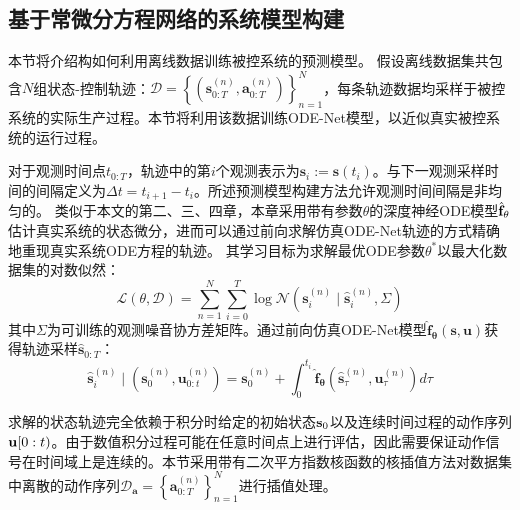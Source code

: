\subsection{基于常微分方程网络的系统模型构建}
\label{sec:ode_system_modeling}
本节将介绍构如何利用离线数据训练被控系统的预测模型。
假设离线数据集共包含$N$组状态-控制轨迹：$\mathcal{D}=\left\{\left(\mathbf{s}_{0: T}^{(n)}, \mathbf{a}_{0: T}^{(n)}\right)\right\}_{n=1}^{N}$，每条轨迹数据均采样于被控系统的实际生产过程。本节将利用该数据训练ODE-Net模型，以近似真实被控系统的运行过程。

对于观测时间点$t_{0: T}$，轨迹中的第$i$个观测表示为$\mathbf{s}_{i}:=\mathbf{s}\left(t_{i}\right)$。与下一观测采样时间的间隔定义为$\Delta t = t_{i+1}-t_i$。所述预测模型构建方法允许观测时间间隔是非均匀的。
类似于本文的第二、三、四章，本章采用带有参数$\theta$的深度神经ODE模型$\hat{\mathbf{f}}_\theta$估计真实系统的状态微分，进而可以通过前向求解仿真ODE-Net轨迹的方式精确地重现真实系统ODE方程的轨迹。
其学习目标为求解最优ODE参数$\theta^*$以最大化数据集的对数似然：
\begin{equation}
\label{equ:likelihood}
    \mathcal{L}(\theta, \mathcal{D})=\sum_{n=1}^{N} \sum_{i=0}^{T} \log \mathcal{N}\left(\mathbf{s}_{i}^{(n)} \mid \hat{\mathbf{s}}_{i}^{(n)}, \Sigma\right)
\end{equation}
其中$\Sigma$为可训练的观测噪音协方差矩阵。通过前向仿真ODE-Net模型$\hat{\mathbf{f}}_{\boldsymbol{\theta}}(\mathbf{s}, \mathbf{u})$获得轨迹采样$\hat{\mathbf{s}}_{0:T}$：
\begin{equation}
\label{equ:state_traj}
\hat{\mathbf{s}}_{i}^{(n)} \mid\left(\mathbf{s}_{0}^{(n)}, \mathbf{u}_{0: t}^{(n)}\right)=\mathbf{s}_{0}^{(n)}+\int_{0}^{t_{i}} \hat{\mathbf{f}}_{\boldsymbol{\theta}}\left(\hat{\mathbf{s}}_{\tau}^{(n)}, \mathbf{u}_{\tau}^{(n)}\right) d \tau
\end{equation}

求解的状态轨迹完全依赖于积分时给定的初始状态$\mathbf s_0$以及连续时间过程的动作序列$\mathbf u[0:t)$。由于数值积分过程可能在任意时间点上进行评估，因此需要保证动作信号在时间域上是连续的。本节采用带有二次平方指数核函数的核插值方法对数据集中离散的动作序列$\mathcal{D}_{\mathbf{a}}=\left\{\mathbf{a}_{0: T}^{(n)}\right\}_{n=1}^{N}$进行插值处理。

